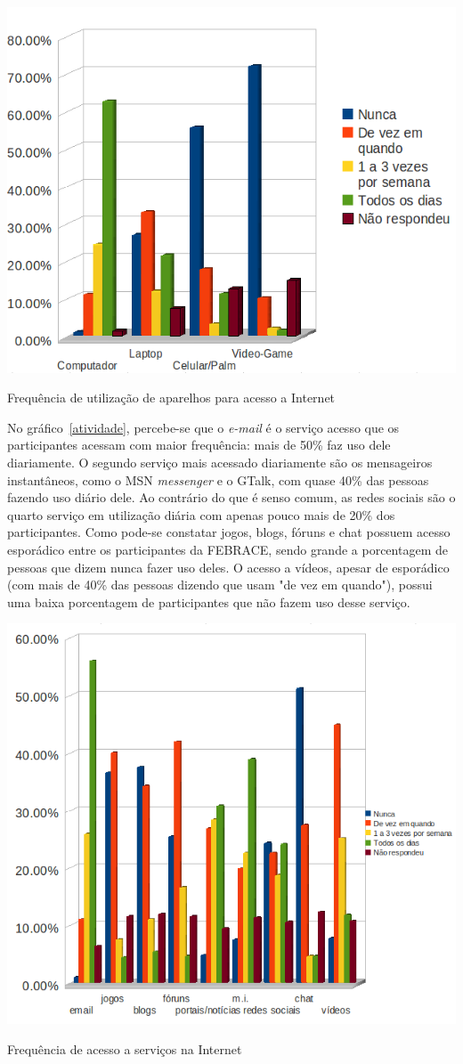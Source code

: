     \begin{grafico}
        \begin{center}
    \includegraphics[width=0.7\linewidth]{arquivos/dispositivo.png}
        \end{center}
        \caption{Frequência de utilização de aparelhos para acesso a Internet}
        \label{dispositivo}
    \end{grafico}

    No gráfico~\ref{atividade}, percebe-se que o \textit{e-mail} é o serviço acesso que os participantes acessam com maior frequência: mais de 50\% faz uso dele diariamente. O segundo serviço mais acessado diariamente são os mensageiros instantâneos, como o MSN \textit{messenger} e o GTalk, com quase 40\%  das pessoas fazendo uso diário dele. Ao contrário do que é senso comum, as redes sociais são o quarto serviço em utilização diária com apenas pouco mais de 20\% dos participantes. Como pode-se constatar jogos, blogs, fóruns e chat possuem acesso esporádico entre os participantes da FEBRACE, sendo grande a porcentagem de pessoas que dizem nunca fazer uso deles. O acesso a vídeos, apesar de esporádico (com mais de 40\% das pessoas dizendo que usam "de vez em quando"), possui uma baixa porcentagem de participantes que não fazem uso desse serviço.

    \begin{grafico}
        \begin{center}
    \includegraphics[width=0.7\linewidth]{arquivos/atividade.png}
        \end{center}
        \caption{Frequência de acesso a serviços na Internet}
        \label{atividade}
    \end{grafico}

